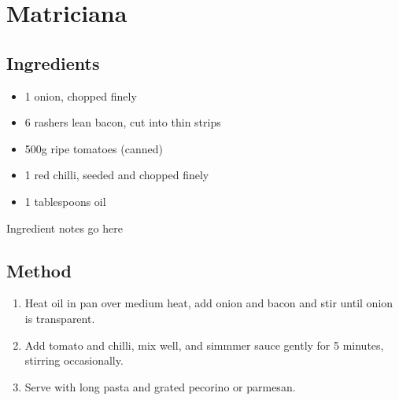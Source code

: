 \section{Matriciana}


\subsection{Ingredients}

\begin{itemize}
    \item 1 onion, chopped finely
    \item 6 rashers lean bacon, cut into thin strips
    \item 500g ripe tomatoes (canned)
    \item 1 red chilli, seeded and chopped finely
    \item 1 tablespoons oil
\end{itemize}

Ingredient notes go here

\subsection{Method}

\begin{enumerate}
    \item Heat oil in pan over medium heat, add onion and bacon and stir until onion is transparent.
    \item Add tomato and chilli, mix well, and simmmer sauce gently for 5 minutes, stirring occasionally.
    \item Serve with long pasta and grated pecorino or parmesan.
\end{enumerate}
